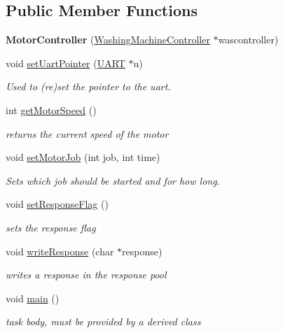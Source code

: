 \subsection*{Public Member Functions}
\begin{DoxyCompactItemize}
\item 
{\bfseries Motor\+Controller} (\hyperlink{class_washing_machine_controller}{Washing\+Machine\+Controller} $\ast$wascontroller)\hypertarget{class_motor_controller_a0e65c9ad63cd7223f5a7142a90560ce2}{}\label{class_motor_controller_a0e65c9ad63cd7223f5a7142a90560ce2}

\item 
void \hyperlink{class_motor_controller_ae34c69473ebfecda74c19646c7dd552f}{set\+Uart\+Pointer} (\hyperlink{class_u_a_r_t}{U\+A\+RT} $\ast$u)
\begin{DoxyCompactList}\small\item\em Used to (re)set the pointer to the uart. \end{DoxyCompactList}\item 
int \hyperlink{class_motor_controller_aecc8cb83b9697bc4fd43494d94d7f451}{get\+Motor\+Speed} ()
\begin{DoxyCompactList}\small\item\em returns the current speed of the motor \end{DoxyCompactList}\item 
void \hyperlink{class_motor_controller_ac204dff745500f9b8711fd4d7bc68d6d}{set\+Motor\+Job} (int job, int time)
\begin{DoxyCompactList}\small\item\em Sets which job should be started and for how long. \end{DoxyCompactList}\item 
void \hyperlink{class_motor_controller_ade1ac6f1cec888d6c6876c74ab0fb4f8}{set\+Response\+Flag} ()
\begin{DoxyCompactList}\small\item\em sets the response flag \end{DoxyCompactList}\item 
void \hyperlink{class_motor_controller_ae0b037cd1c059650c4cf03fee8c1f317}{write\+Response} (char $\ast$response)
\begin{DoxyCompactList}\small\item\em writes a response in the response pool \end{DoxyCompactList}\item 
void \hyperlink{class_motor_controller_acf35f82b30986fb4702933d21eee03ea}{main} ()
\begin{DoxyCompactList}\small\item\em task body, must be provided by a derived class \end{DoxyCompactList}\end{DoxyCompactItemize}

